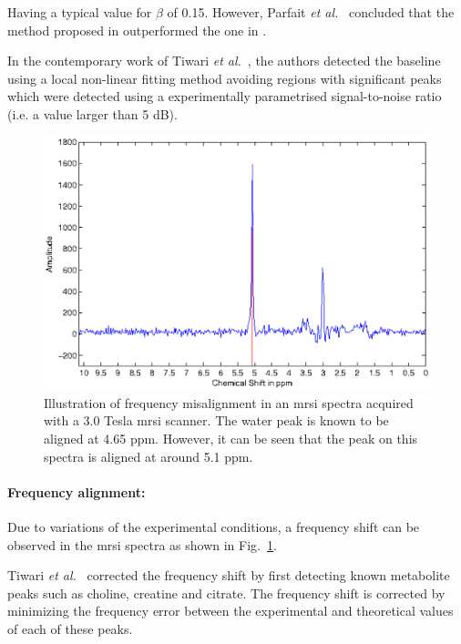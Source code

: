 \noindent Having a typical value for $\beta$ of 0.15.
However, Parfait \textit{et al.}~\cite{Parfait2012} concluded that the method proposed in \cite{Lieber2003} outperformed the one in \cite{Devos2004}.

In the contemporary work of Tiwari \textit{et al.}~\cite{Tiwari2012}, the authors detected the baseline using a local non-linear fitting method avoiding regions with significant peaks which were detected using a experimentally parametrised signal-to-noise ratio (i.e. a value larger than 5 dB).


\begin{figure}
\centering
	\includegraphics[width=0.7\linewidth]{3_review/figures/processing/pre-processing/frequency/frequency.eps}
	\caption[Illustration of frequency misalignment in an \ac{mrsi} spectra.]{Illustration of frequency misalignment in an \ac{mrsi} spectra acquired with a 3.0 Tesla \ac{mrsi} scanner. The water peak is known to be aligned at 4.65 ppm. However, it can be seen that the peak on this spectra is aligned at around 5.1 ppm.}
	\label{fig:frequency}
\end{figure}

\paragraph{Frequency alignment:}
Due to variations of the experimental conditions, a frequency shift can be observed in the \ac{mrsi} spectra \cite{Chen2002,Osorio-Garcia2012} as shown in Fig.~\ref{fig:frequency}.
	
Tiwari \textit{et al.}~\cite{Tiwari2012} corrected the frequency shift by first detecting known metabolite peaks such as choline, creatine and citrate.
The frequency shift is corrected by minimizing the frequency error between the experimental and theoretical values of each of these peaks.

